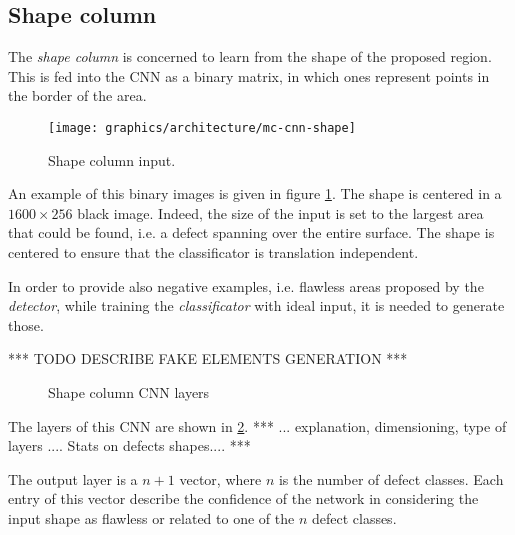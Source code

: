     \subsection{Shape column}\label{section:shape-column}
        \par{
            The \emph{shape column} is concerned to learn from the shape of the proposed region. This is fed into the CNN as a binary matrix, in which ones represent points in the border of the area.
        }
        \begin{figure}
            \centering
            \texttt{[image: graphics/architecture/mc-cnn-shape]}
            \caption{Shape column input.}\label{fig:mc-cnn:shape-input}
        \end{figure}
        \par{
            An example of this binary images is given in figure \ref{fig:mc-cnn:shape-input}. The shape is centered in a $1600\times 256$ black image. Indeed, the size of the input is set to the largest area that could be found, i.e. a defect spanning over the entire surface. The shape is centered to ensure that the classificator is translation independent. 
        }
        \par{
            In order to provide also negative examples, i.e. flawless areas proposed by the \emph{detector}, while training the \emph{classificator} with ideal input, it is needed to generate those.
        }
        \par{
            *** TODO DESCRIBE FAKE ELEMENTS GENERATION ***
        }
        \begin{figure}
            \centering
            \caption{Shape column CNN layers}\label{fig:mc-cnn:shape-structure}
        \end{figure}
        \par{
            The layers of this CNN are shown in \ref{fig:mc-cnn:shape-structure}. *** ... explanation, dimensioning, type of layers .... Stats on defects shapes.... ***
        }
        \par{
            The output layer is a $n + 1$ vector, where $n$ is the number of defect classes. Each entry of this vector describe the confidence of the network in considering the input shape as flawless or related to one of the $n$ defect classes.
        }
